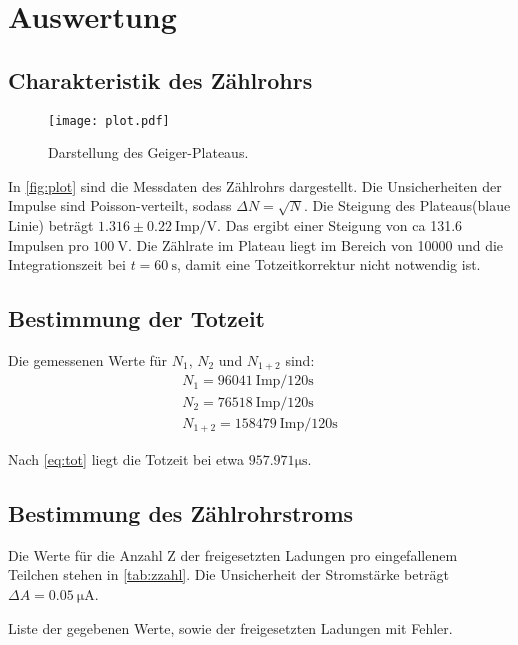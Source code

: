 \newpage
\section{Auswertung}
\label{sec:Auswertung}

\subsection{Charakteristik des Zählrohrs}

\begin{figure}
  \centering
  \texttt{[image: plot.pdf]}
  \caption{Darstellung des Geiger-Plateaus.}
  \label{fig:plot}
\end{figure}


In \autoref{fig:plot} sind die Messdaten des Zählrohrs dargestellt.
Die Unsicherheiten der Impulse sind Poisson-verteilt, sodass $\Delta N = \sqrt{N}$.
Die Steigung des Plateaus(blaue Linie) beträgt $1.316\pm0.22\ \text{Imp/V}$.
Das ergibt einer Steigung von ca 131.6 Impulsen pro $\SI{100}{\volt}$.
Die Zählrate im Plateau liegt im Bereich von 10000 und die Integrationszeit bei $t = \SI{60}{\second}$, damit eine Totzeitkorrektur nicht notwendig ist.

\subsection{Bestimmung der Totzeit}
Die gemessenen Werte für $N_1$, $N_2$ und $N_{1+2}$ sind:
\begin{align*}
  N_1 = 96041\ \text{Imp/120s}\\
  N_2 = 76518\ \text{Imp/120s}\\
  N_{1+2} = 158479\ \text{Imp/120s}
\end{align*}

Nach \autoref{eq:tot} liegt die Totzeit bei etwa $957.971\si{\micro\second}$.

\subsection{Bestimmung des Zählrohrstroms}
Die Werte für die Anzahl Z der freigesetzten Ladungen pro eingefallenem Teilchen stehen in \autoref{tab:zzahl}.
Die Unsicherheit der Stromstärke beträgt $\Delta A = \SI{0.05}{\micro\ampere}$.

\begin{table}
  \centering
  \caption{Liste der gegebenen Werte, sowie der freigesetzten Ladungen mit Fehler.}
  \label{tab:zzahl}
\end{table}

